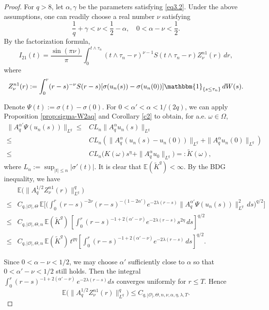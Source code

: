 \documentclass[10pt]{article}
\numberwithin{figure}{section}
\numberwithin{equation}{section}
\newcommand{\0}{{\theta}}
\def\sig{\sigma}
\def\gam{\gamma}
\def\w{\omega}
\def\a{\alpha}
\def\W{\Omega}
\def\~{\tilde}
\def\8{\infty}
\def\E{\mathbb{E}}
\def\({\left(}\def\){\right)}
\begin{document}
\begin{proof} 
For $q>8$, let $\alpha,\gamma$ be the parameters satisfying \eqref{eq3.2}. Under the above assumptions, one can readily choose a real number $\nu$ satisfying
$$\frac{1}{q}+\gam<\nu<\frac{1}{2}-\a,\quad 0<\a-\nu<\frac{1}{2}.$$
\vs
By the factorization formula, 
$$
I_{21}(t)=\frac{\sin(\pi\nu)}{\pi}\int_0^{t\wedge\tau_n}(t\wedge\tau_n-r)^{\nu-1}S(t\wedge\tau_n-r)Z_\nu^{n1}(r)\,dr,
$$
where
$$
Z_\nu^{n1}(r):=\int_0^r(r-s)^{-\nu}S(r-s)[\sigma(u_n(s))-\sigma(u_n(0))]\mathbbm{1}_{\{s\le\tau_n\}}\,dW(s).
$$



Denote $\Psi(t):=\sigma(t)-\sigma(0)$. For $0<\a'<\a<1/(2q)$, we can apply Proposition \ref{prop:sigma-W2aq} and Corollary \ref{c2} to obtain, for a.e. $\w\in\W$,
$$\begin{aligned}
\|A_q^{\a'}\Psi(u_n(s))\|_{L^q}\le& CL_n\|A_q^\a u_n(s)\|_{L^q}\\
\le&CL_n\(\|A_q^\a(u_n(s)-u_n(0))\|_{L^q}+\|A_q^{\a}u_n(0)\|_{L^q}\)\\
\le& CL_n\big(K(\omega)s^\eta+\|A_q^\a u_0\|_{L^q}\big)=:\~K(\w),\end{aligned}
$$ where $L_n:=\sup_{|t|\le n}|\sig'(t)|$.
It is clear that $\E(\~K^q)<\8$.
By the BDG inequality, we have
$$
\begin{aligned}
&\mathbb{E}\big(\|A_q^{1/2}Z_\nu^{n1}(r)\|_{L^q}^q\big)\\
\le& C_{q,|\mathcal O|,\Theta}\,
\mathbb{E}\Bigg[\Bigg(
\int_0^r(r-s)^{-2\nu}(r-s)^{-(1-2\alpha')}e^{-2\lambda(r-s)}
\|A_q^{\a'}\Psi(u_n(s))\|_{L^q}^2\,ds
\Bigg)^{q/2}\Bigg] \\
\le& C_{q,|\mathcal O|,\Theta,n}\,\mathbb{E}(\tilde K^q)\,
\left[
\int_0^r(r-s)^{-1+2(\alpha'-\nu)}e^{-2\lambda(r-s)}s^{2\eta}\,ds
\right]^{q/2}\\
\le& C_{q,|\mathcal O|,\Theta,n}\,\mathbb{E}(\tilde K^q)\,t^{q\eta}
\left[
\int_0^r(r-s)^{-1+2(\alpha'-\nu)}e^{-2\lambda(r-s)}\,ds
\right]^{q/2}.
\end{aligned}
$$

Since $0<\alpha-\nu<1/2$, we may choose $\alpha'$ sufficiently close to $\alpha$ so that $0<\alpha'-\nu<1/2$ still holds. Then the integral
$
\int_0^r(r-s)^{-1+2(\alpha'-\nu)}\,e^{-2\lambda(r-s)}ds
$
converges uniformly for $r\le T$. Hence
$$
\mathbb{E}\big(\|A_q^{1/2}Z_\nu^{n1}(r)\|_{L^q}^q\big)
\le C_{q,|\mathcal O|,\Theta,n,\nu,\alpha,\eta,\lambda,T}.
$$


\end{proof}
\end{document}
